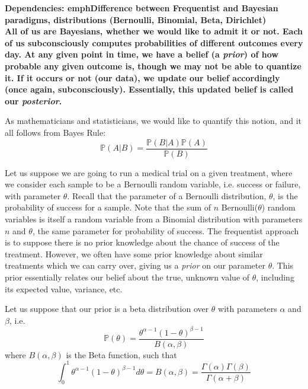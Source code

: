\bf{Dependencies:} emph{Difference between Frequentist and Bayesian paradigms, distributions (Bernoulli, Binomial, Beta, Dirichlet)}\\

All of us are Bayesians, whether we would like to admit it or not. Each of us subconsciously computes probabilities of different outcomes every day. At any given point in time, we have a belief (a \emph{prior}) of how probable any given outcome is, though we may not be able to quantize it. If it occurs or not (our data), we update our belief accordingly (once again, subconsciously). Essentially, this updated belief is called our \emph{posterior}.

As mathematicians and statisticians, we would like to quantify this notion, and it all follows from Bayes Rule:
\begin{equation*}
\mathbb{P}(A | B) = \frac{\mathbb{P}(B | A)\mathbb{P}(A)}{\mathbb{P}(B)}
\end{equation*}

Let us suppose we are going to run a medical trial on a given treatment, where we consider each sample to be a Bernoulli random variable, i.e. success or failure, with parameter $\theta$. Recall that the parameter of a Bernoulli distribution, $\theta$, is the probability of success for a sample.  Note that the sum of $n$ Bernoulli($\theta$) random variables is itself a random variable from a Binomial distribution with parameters $n$ and $\theta$, the same parameter for probability of success. The frequentist approach is to suppose there is no prior knowledge about the chance of success of the treatment. However, we often have some prior knowledge about similar treatments which we can carry over, giving us a \emph{prior} on our parameter $\theta$. This prior essentially relates our belief about the true, unknown value of $\theta$, including its expected value, variance, etc.

Let us suppose that our prior is a beta distribution over $\theta$ with parameters $\alpha$ and $\beta$, i.e. 
\begin{equation*}
\mathbb{P}(\theta) = \frac{\theta^{\alpha - 1}(1 - \theta)^{\beta - 1}}{B(\alpha,\beta)}
\end{equation*}
where $B(\alpha,\beta)$ is the Beta function, such that 
\begin{equation*}
\int_0^1 \theta^{\alpha - 1}(1 - \theta)^{\beta - 1} d\theta = B(\alpha,\beta) = \frac{\Gamma(\alpha)\Gamma(\beta)}{\Gamma(\alpha +\beta)}
\end{equation*}

